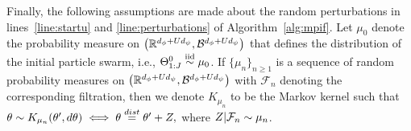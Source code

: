 \documentclass[12pt]{article}\usepackage[]{graphicx}\usepackage[]{xcolor}
\begin{document}
\begin{appendices}
Finally, the following assumptions are made about the random perturbations in lines~\ref{line:startu} and \ref{line:perturbations} of Algorithm~\ref{alg:mpif}.
Let $\mu_0$ denote the probability measure on $\big(\mathbb{R}^{d_\phi + Ud_\psi}, \mathcal{B}^{d_\phi+Ud_\psi}\big)$ that defines the distribution of the initial particle swarm, i.e., $\Theta_{1:J}^0 \overset{\text{iid}}{\sim} \mu_0$.
If $\{\mu_n\}_{n \geq 1}$ is a sequence of random probability measures \citep{crauel02} on $\big(\mathbb{R}^{d_\phi + Ud_\psi}, \mathcal{B}^{d_\phi+Ud_\psi}\big)$ with $\mathcal{F}_n$ denoting the corresponding filtration, then we denote $K_{\mu_n}$ to be the Markov kernel such that \linebreak $\theta \sim K_{\mu_n}(\theta', d\theta) \iff \theta \overset{dist}{=}\theta' + Z,$ where $Z|\mathcal{F}_n \sim \mu_n$.


\end{appendices}
\end{document}
